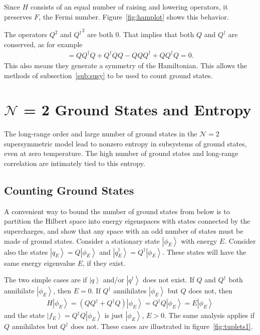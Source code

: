 \documentclass[12pt]{article} %
\renewcommand{\cal}{\mathcal}
\newcommand{\ket}[1]{\left|#1\right\rangle}
\begin{document}
Since $H$ consists of an equal number of raising and lowering operators, it preserves $F$, the Fermi number. Figure~\ref{fig:hamplot} shows this behavior.

The operators $Q^2$ and ${Q^\dag}^2$ are both 0. That implies that both $Q$ and $Q^\dag$ are conserved, as for example
\begin{align}
[H,Q] = QQ^\dag Q + Q^\dag QQ - QQQ^\dag + QQ^\dag Q = 0.
\end{align}
This also means they generate a symmetry of the Hamiltonian. This allows the methods of subsection~\ref{sub:susy} to be used to count ground states.

\section{$\cal{N}$ = 2 Ground States and Entropy} \label{sec:N2gs_ent}

The long-range order and large number of ground states in the $\cal N = 2$ supersymmetric model lead to nonzero entropy in subsystems of ground states, even at zero temperature. The high number of ground states and long-range correlation are intimately tied to this entropy.

\subsection{Counting Ground States} \emph{}\label{sub:count_gs}

A convenient way to bound the number of ground states from below is to partition the Hilbert space into energy eigenspaces with states connected by the supercharges, and show that any space with an odd number of states must be made of ground states. Consider a stationary state $\ket{\phi_E}$ with energy $E$. Consider also the states $\ket{q_E} = Q\ket{\phi_E}$ and $\ket{q^\dag_E}= Q^\dag \ket{\phi_E}$. These states will have the same energy eigenvalue $E$, if they exist. 

The two simple cases are if $\ket{q}$ and/or $\ket{q^\dag}$ does not exist. If $Q$ and $Q^\dag$ both annihilate $\ket{\phi_E}$, then $E=0$. If $Q^\dag$ annihilates $\ket{\phi_E}$ but $Q$ does not, then 
\begin{align}
H\ket{\phi_E} = (QQ^\dag + Q^\dag Q)\ket{\phi_E} = Q^\dag Q\ket{\phi_E} = E\ket{\phi_E}
\end{align}
and the state $\ket{f_E} = Q^\dag Q\ket{\phi_E}$ is just $\ket{\phi_E}$, $E>0$. The same analysis applies if $Q$ annihilates but $Q^\dag$ does not. These cases are illustrated in figure~\ref{fig:tuplets1}.
\end{document}
